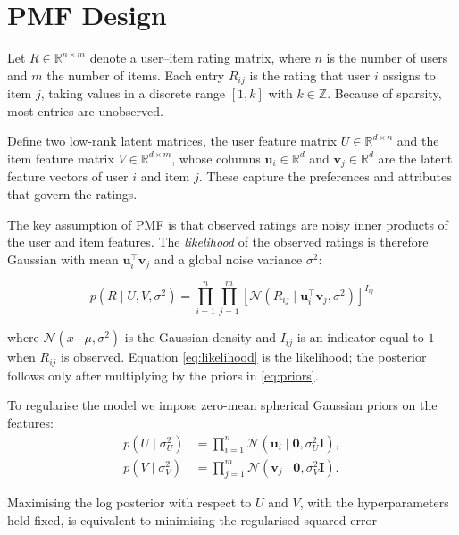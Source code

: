 \documentclass[conference]{IEEEtran}
\begin{document}
\section{PMF Design}
\label{section:pmf-design}

Let $R \in \mathbb{R}^{n \times m}$ denote a user--item rating matrix, where $n$ is the
number of users and $m$ the number of items. Each entry $R_{ij}$ is the rating that user
$i$ assigns to item $j$, taking values in a discrete range $[1,k]$ with $k \in \mathbb{Z}$.
Because of sparsity, most entries are unobserved.

Define two low-rank latent matrices, the user feature matrix $U \in \mathbb{R}^{d\times n}$
and the item feature matrix $V \in \mathbb{R}^{d \times m}$, whose columns $\mathbf{u}_i
\in \mathbb{R}^d$ and $\mathbf{v}_j \in \mathbb{R}^d$ are the latent feature vectors of user
$i$ and item $j$. These capture the preferences and attributes that govern the ratings.

The key assumption of PMF is that observed ratings are noisy inner products of the user and
item features. The \emph{likelihood} of the observed ratings is therefore Gaussian with
mean $\mathbf{u}_i^\top\mathbf{v}_j$ and a global noise variance $\sigma^2$:

\begin{equation}
  p(R \mid U, V, \sigma^2) =
    \prod_{i=1}^{n}\prod_{j=1}^{m}
    \left[\mathcal{N}\!\left(R_{ij} \mid \mathbf{u}_i^\top\mathbf{v}_j, \sigma^2\right)\right]^{I_{ij}}
  \label{eq:likelihood}
\end{equation}

where $\mathcal{N}(x \mid \mu,\sigma^2)$ is the Gaussian density and $I_{ij}$ is an
indicator equal to $1$ when $R_{ij}$ is observed. Equation \eqref{eq:likelihood} is the
likelihood; the posterior follows only after multiplying by the priors in
\eqref{eq:priors}.

To regularise the model we impose zero-mean spherical Gaussian priors on the features:
\begin{equation}
\begin{aligned}
  p(U \mid \sigma_U^2) &= \prod_{i=1}^{n}\mathcal{N}(\mathbf{u}_i \mid \mathbf{0}, \sigma_U^2\mathbf{I}),\\
  p(V \mid \sigma_V^2) &= \prod_{j=1}^{m}\mathcal{N}(\mathbf{v}_j \mid \mathbf{0}, \sigma_V^2\mathbf{I}).
\end{aligned}
\label{eq:priors}
\end{equation}

Maximising the log posterior with respect to $U$ and $V$, with the hyperparameters held
fixed, is equivalent to minimising the regularised squared error
\end{document}
